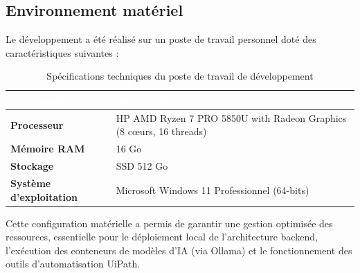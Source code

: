 


\subsection{Environnement matériel}

Le développement a été réalisé sur un poste de travail personnel doté des caractéristiques suivantes :

\vspace{8pt}

\begin{table}[H]
  \centering
  \renewcommand{\arraystretch}{1.5}
  \setlength{\tabcolsep}{12pt}
  \begin{tabularx}{\textwidth}{|>{\bfseries\color{white}\columncolor{boaGreen}}l|X|}
    \hline\hline
    \rowcolor{boaGreen}
    \textcolor{white}{Composant} & \textcolor{white}{Spécification} \\ \hline
    
    Processeur & HP AMD Ryzen 7 PRO 5850U with Radeon Graphics (8 cœurs, 16 threads) \\ 
    Mémoire RAM & \cellcolor{boaGray} 16 Go \\ 
    
    Stockage & SSD 512 Go \\ 
    Système d’exploitation & \cellcolor{boaGray} Microsoft Windows 11 Professionnel (64-bits) \\ 
    \hline\hline
  \end{tabularx}
  \caption{Spécifications techniques du poste de travail de développement}
  \label{tab:specs_materiel}
\end{table}

\vspace{8pt}

Cette configuration matérielle a permis de garantir une gestion optimisée des ressources, essentielle pour le déploiement local de l'architecture backend, l'exécution des conteneurs de modèles d'IA (via Ollama) et le fonctionnement des outils d'automatisation UiPath.
